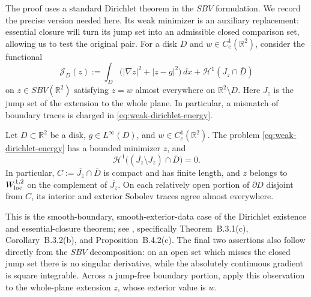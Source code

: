 The proof uses a standard Dirichlet theorem in the $SBV$ formulation.
We record the precise version needed here. Its weak minimizer is an
auxiliary replacement: essential closure will turn its jump set into an
admissible closed comparison set, allowing us to test the original pair.
For a disk $D$ and
$w\in C^1_c(\mathbb R^2)$, consider the functional
\begin{equation}
 \mathcal J_D(z)
 :=\int_D\bigl(|\nabla z|^2+|z-g|^2\bigr)\,dx
      +\mathcal H^1(J_z\cap\overline D)
 \label{eq:weak-dirichlet-energy}
\end{equation}
on $z\in SBV(\mathbb R^2)$ satisfying $z=w$ almost everywhere on
$\mathbb R^2\setminus D$.  Here $J_z$ is the jump set of the extension
to the whole plane.  In particular, a mismatch of boundary traces is
charged in \eqref{eq:weak-dirichlet-energy}.

\begin{lemma}
\label{lem:dirichlet-input}
Let $D\subset\mathbb R^2$ be a disk, $g\in L^\infty(D)$, and
$w\in C^1_c(\mathbb R^2)$.  The problem
\eqref{eq:weak-dirichlet-energy} has a bounded minimizer $z$, and
\begin{equation}
 \mathcal H^1\bigl((\overline{J_z}\setminus J_z)
                  \cap\overline D\bigr)=0.
 \label{eq:dirichlet-essential-closure}
\end{equation}
In particular, $C:=\overline{J_z}\cap\overline D$ is compact and has
finite length, and $z$ belongs to $W^{1,2}_{\rm loc}$ on the complement
of $\overline{J_z}$.  On each relatively open portion of $\partial D$ disjoint from $C$,
its interior and exterior Sobolev traces agree almost everywhere.
\end{lemma}

This is the smooth-boundary, smooth-exterior-data case of the Dirichlet
existence and essential-closure theorem; see
\cite[Appendix~B]{delellis_focardi2025}, specifically
Theorem~B.3.1(c), Corollary~B.3.2(b), and Proposition~B.4.2(c).
The final two assertions also follow directly from the $SBV$ decomposition:
on an open set which misses the closed jump set there is no singular
derivative, while the absolutely continuous gradient is square integrable.
Across a jump-free boundary portion, apply this observation to the
whole-plane extension $z$, whose exterior value is $w$.

